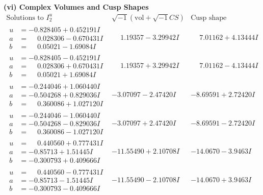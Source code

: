 \documentclass[1p]{elsarticle_modified}
\theoremstyle{definition}
\newcommand{\I}{\sqrt{-1}}
\begin{document}
\newpage\flushleft \textbf{(vi) Complex Volumes and Cusp Shapes}
$$\begin{array}{c|c|c}  
\text{Solutions to }I^u_{2}& \I (\text{vol} + \sqrt{-1}CS) & \text{Cusp shape}\\
 \hline 
\begin{aligned}
u &= -0.828405 + 0.452191 I \\
a &= \phantom{-}0.028306 - 0.670431 I \\
b &= \phantom{-}0.05021 - 1.69084 I\end{aligned}
 & \phantom{-}1.19357 - 3.29942 I & \phantom{-}7.01162 + 4.13444 I \\ \hline\begin{aligned}
u &= -0.828405 - 0.452191 I \\
a &= \phantom{-}0.028306 + 0.670431 I \\
b &= \phantom{-}0.05021 + 1.69084 I\end{aligned}
 & \phantom{-}1.19357 + 3.29942 I & \phantom{-}7.01162 - 4.13444 I \\ \hline\begin{aligned}
u &= -0.244046 + 1.060440 I \\
a &= -0.504268 + 0.829036 I \\
b &= \phantom{-}0.360086 + 1.027120 I\end{aligned}
 & -3.07097 - 2.47420 I & -8.69591 + 2.72420 I \\ \hline\begin{aligned}
u &= -0.244046 - 1.060440 I \\
a &= -0.504268 - 0.829036 I \\
b &= \phantom{-}0.360086 - 1.027120 I\end{aligned}
 & -3.07097 + 2.47420 I & -8.69591 - 2.72420 I \\ \hline\begin{aligned}
u &= \phantom{-}0.440560 + 0.777431 I \\
a &= -0.85713 + 1.51445 I \\
b &= -0.300793 + 0.409666 I\end{aligned}
 & -11.55490 + 2.10708 I & -14.0670 - 3.9463 I \\ \hline\begin{aligned}
u &= \phantom{-}0.440560 - 0.777431 I \\
a &= -0.85713 - 1.51445 I \\
b &= -0.300793 - 0.409666 I\end{aligned}
 & -11.55490 - 2.10708 I & -14.0670 + 3.9463 I \\ \hline\begin{aligned}

\end{aligned}
\end{array}$$
\end{document}
